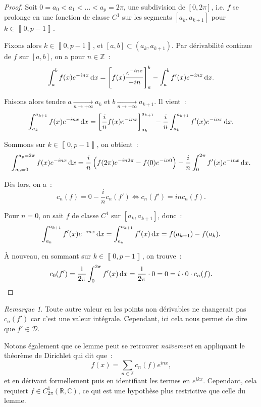 \documentclass{report}
\theoremstyle{definition}
\theoremstyle{remark}
\newtheorem*{rmq}{Remarque}
\numberwithin{equation}{section}
\newcommand{\C}{\mathbb C}
\newcommand{\R}{\mathbb R}
\newcommand{\Z}{\mathbb Z}
\newcommand{\intint}[2]{\left\llbracket#1, #2\right\rrbracket}
\newcommand{\pinfty}{{+\infty}}
\begin{document}
			\begin{proof} Soit $0 = a_0 < a_1 < \ldots < a_p = 2\pi$, une subdivision de $[0, 2\pi]$, i.e. $f$ se prolonge en une fonction de classe $C^1$ sur les
			segments $[a_k, a_{k+1}]$ pour $k \in \intint 0{p-1}$.

			Fixons alors $k \in \intint 0{p-1}$, et $[a, b] \subset (a_k, a_{k+1})$. Par dérivabilité continue de $f$ sur $[a, b]$, on a pour $n \in \Z$~:
			\begin{equation}
				\int_a^b f(x)e^{-inx}\dif x = \left[f(x)\frac {e^{-inx}}{-in}\right]_a^b - \int_a^b f'(x)e^{-inx}\dif x.
			\end{equation}

			Faisons alors tendre $a \xrightarrow[n \to \pinfty]{} a_k$ et $b \xrightarrow[n \to \pinfty]{} a_{k+1}$. Il vient~:
			\begin{equation}
				\int_{a_k}^{a_{k+1}} f(x)e^{-inx}\dif x = \left[\frac in f(x)e^{-inx}\right]_{a_k}^{a_{k+1}} - \frac in\int_{a_k}^{a_{k+1}}f'(x)e^{-inx}\dif x.
			\end{equation}

			Sommons sur $k \in \intint 0{p-1}$, on obtient~:
			\begin{equation}
				\int_{a_0=0}^{a_p=2\pi}f(x)e^{-inx}\dif x = \frac in\left(f(2\pi)e^{-in2\pi} - f(0)e^{-in0}\right) - \frac in \int_0^{2\pi}f'(x)e^{-inx}\dif x.
			\end{equation}

			Dès lors, on a~:
			\begin{equation}
				c_n(f) = 0 - \frac inc_n(f') \iff c_n(f') = inc_n(f).
			\end{equation}

			Pour $n = 0$, on sait $f$ de classe $C^1$ sur $[a_k, a_{k+1}]$, donc~:
			\begin{equation}
				\int_{a_k}^{a_{k+1}}f'(x)e^{-inx}\dif x = \int_{a_k}^{a_{k+1}}f'(x)\dif x = f(a_{k+1}) - f(a_k).
			\end{equation}

			À nouveau, en sommant sur $k \in \intint 0{p-1}$, on trouve~:
			\begin{equation}
				c_0(f') = \frac 1{2\pi}\int_0^{2\pi}f'(x)\dif x = \frac 1{2\pi} \cdot 0 = 0 = i \cdot 0 \cdot c_n(f).
			\end{equation}
			\end{proof}

			\begin{rmq} Toute autre valeur en les points non dérivables ne changerait pas $c_n(f')$ car c'est une valeur intégrale. Cependant, ici cela nous permet de
			dire que $f' \in \mathcal D$.

			Notons également que ce lemme peut se retrouver \textit{naïvement} en appliquant le théorème de Dirichlet qui dit que~:
			\begin{equation}
				f(x) = \sum_{n \in \Z}c_n(f)e^{inx},
			\end{equation}
			et en dérivant formellement puis en identifiant les termes en $e^{ikx}$. Cependant, cela requiert $f \in C^1_{2\pi}(\R, \C)$, ce qui est une hypothèse
			plus restrictive que celle du lemme.
			\end{rmq}
\end{document}
